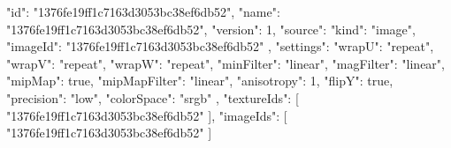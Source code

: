{
  "id": "1376fe19ff1c7163d3053bc38ef6db52",
  "name": "1376fe19ff1c7163d3053bc38ef6db52",
  "version": 1,
  "source": {
    "kind": "image",
    "imageId": "1376fe19ff1c7163d3053bc38ef6db52"
  },
  "settings": {
    "wrapU": "repeat",
    "wrapV": "repeat",
    "wrapW": "repeat",
    "minFilter": "linear",
    "magFilter": "linear",
    "mipMap": true,
    "mipMapFilter": "linear",
    "anisotropy": 1,
    "flipY": true,
    "precision": "low",
    "colorSpace": "srgb"
  },
  "textureIds": [
    "1376fe19ff1c7163d3053bc38ef6db52"
  ],
  "imageIds": [
    "1376fe19ff1c7163d3053bc38ef6db52"
  ]
}
